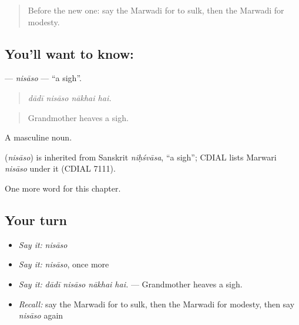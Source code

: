 \label{lesson:MW-C257-nisaso}



\begin{quote}
Before the new one: say the Marwadi for to sulk, then the Marwadi for modesty.
\end{quote}

\subsection*{You'll want to know: }
\textbf{} — \emph{nisāso} — \textquotedblleft{}a sigh\textquotedblright{}.

\begin{quote}
   
\end{quote}

\begin{quote}
\emph{dādī nisāso nākhai hai.}
\end{quote}

\begin{quote}
Grandmother heaves a sigh.
\end{quote}

A masculine noun.

\begin{cousinweb}
\textbf{} (\emph{nisāso}) is inherited from Sanskrit \emph{niḥśvāsa}, \textquotedblleft{}a sigh\textquotedblright{}; CDIAL lists Marwari \emph{nisāso} under it (CDIAL 7111).
\end{cousinweb}

\begin{grammarlens}[title={What you've built}]
One more word for this chapter.
\end{grammarlens}

\subsection*{Your turn}
\begin{itemize}
\raggedright
  \item \emph{Say it:} \emph{nisāso}
  \item \emph{Say it:} \emph{nisāso}, once more
  \item \emph{Say it:} \emph{dādī nisāso nākhai hai.} — Grandmother heaves a sigh.
  \item \emph{Recall:} say the Marwadi for to sulk, then the Marwadi for modesty, then say \emph{nisāso} again
\end{itemize}

